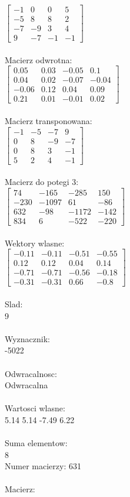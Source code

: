 \documentclass[a4paper,12pt]{article}
\begin{document}
$\begin{bmatrix} -1&0&0&5\\-5&8&8&2\\-7&-9&3&4\\9&-7&-1&-1 \end{bmatrix}$
\\
\\
Macierz odwrotna:\\

$\begin{bmatrix} 0.05&0.03&-0.05&0.1\\0.04&0.02&-0.07&-0.04\\-0.06&0.12&0.04&0.09\\0.21&0.01&-0.01&0.02 \end{bmatrix}$
\\
\\
Macierz transponowana:\\

$\begin{bmatrix} -1&-5&-7&9\\0&8&-9&-7\\0&8&3&-1\\5&2&4&-1 \end{bmatrix}$
\\
\\
Macierz do potegi 3:\\

$\begin{bmatrix} 74&-165&-285&150\\-230&-1097&61&-86\\632&-98&-1172&-142\\834&6&-522&-220 \end{bmatrix}$
\\
\\
Wektory wlasne:\\

$\begin{bmatrix} -0.11&-0.11&-0.51&-0.55\\0.12&0.12&0.04&0.14\\-0.71&-0.71&-0.56&-0.18\\-0.31&-0.31&0.66&-0.8 \end{bmatrix}$
\\
\\
Slad:\\
9
\\
\\
Wyznacznik:\\
-5022
\\
\\
Odwracalnosc:\\
Odwracalna
\\
\\
Wartosci wlasne:\\
5.14 5.14 -7.49 6.22
\\
\\
Suma elementow:\\
8
\\
\newpage
Numer macierzy:
631
\\
\\
Macierz:\\
\end{document}
